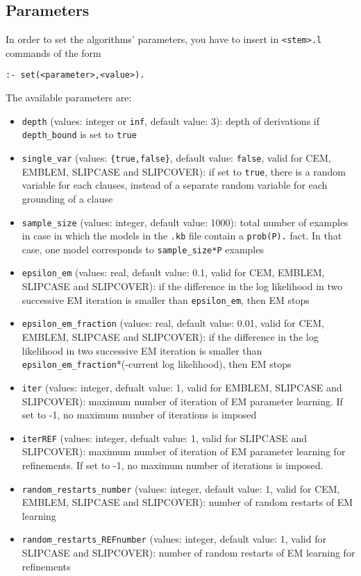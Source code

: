 \documentclass[a4paper,10pt]{article}
\begin{document}
\subsection{Parameters}
In order to set the algorithms' parameters, you have to insert in \texttt{<stem>.l}  commands of the form
\begin{verbatim}
:- set(<parameter>,<value>).
\end{verbatim}
The available parameters are:
\begin{itemize}
\item \verb|depth| (values: integer or \verb|inf|, default value: 3): depth of derivations if  \verb|depth_bound|  is set to \verb|true|
\item \verb|single_var| (values: \verb|{true,false}|, default value: \verb|false|, valid for CEM, EMBLEM, SLIPCASE and SLIPCOVER): if set to \verb|true|, there is a random variable for each clauses, instead of a separate random variable for each grounding of a clause
\item \verb|sample_size| (values: integer, default value: 1000): total number of examples in case in which the models in the \verb|.kb| file contain a \verb|prob(P).| fact. In that case, one model corresponds to \verb|sample_size*P| examples
\item \verb|epsilon_em| (values: real, default value: 0.1, valid for CEM, EMBLEM, SLIPCASE and SLIPCOVER): if the difference in the log likelihood in two successive EM iteration is smaller
than \verb|epsilon_em|, then EM stops 
\item \verb|epsilon_em_fraction| (values: real, default value: 0.01, valid for CEM, EMBLEM, SLIPCASE and SLIPCOVER): if the difference in the log likelihood in two successive EM iteration is smaller
than \verb|epsilon_em_fraction|*(-current log likelihood), then EM stops
\item \verb|iter| (values: integer, defualt value: 1, valid for EMBLEM, SLIPCASE and SLIPCOVER): maximum number of iteration of EM parameter learning. If set to -1, no maximum number of iterations is imposed
\item \verb|iterREF| (values: integer, defualt value: 1, valid for  SLIPCASE and SLIPCOVER):
 maximum number of iteration of EM parameter learning for refinements. If set to -1, no maximum number of iterations is imposed.
\item \verb|random_restarts_number| (values: integer, default value: 1, valid for CEM, EMBLEM, SLIPCASE and SLIPCOVER): number of random restarts of EM learning
\item \verb|random_restarts_REFnumber| (values: integer, default value: 1, valid for  SLIPCASE and SLIPCOVER): number of random restarts of EM learning for refinements

\end{itemize}
\end{document}
